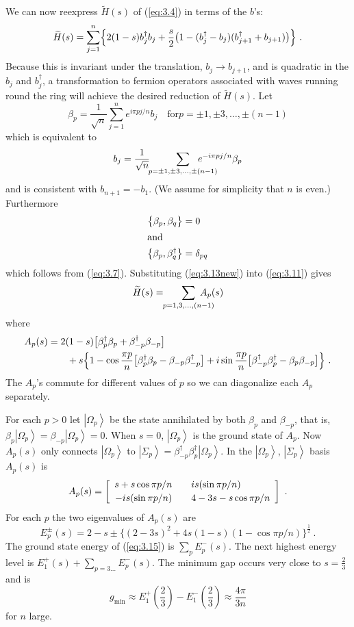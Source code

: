 \documentclass[twoside]{article}
\makeatletter
\newcommand{\ket}[1]{\left|#1\right\rangle}
\newcommand{\numEq}[2]{\begin{equation}
   \label{eq:#1}
   #2\end{equation}}
\newcommand{\refEq}[1]{(\ref{eq:#1})}
\newcommand{\gm}{g_{\min}}
\newcommand{\fract}[2]{{\textstyle\frac#1#2}}
\let\tilde\widetilde
\newcommand{\Casesnew}[1]{
  \begin{array}{r@{\qquad}l}
  #1
  \end{array}}
\numberwithin{equation}{section}
\makeatother
\begin{document}
We can now reexpress $\tilde H(s)$ of \refEq{3.4} in terms of the $b$'s:
\numEq{3.11}{
\tilde H(s) =  \sum_{j=1}^n  \Bigl\{ 2 (1-s) b_j^\dagger b_j + \frac s2
\bigl(1- (b_j^\dagger -b_j) (b_{j+1}^\dagger + b_{j+1})\bigr)
\Bigr\}\ . } 
Because this is invariant under the translation, $b_j\to b_{j+1}$, and is
quadratic in the $b_j$ and $b_j^\dagger$, a transformation to fermion
operators associated with waves running round the ring will achieve the
desired reduction of $\tilde H(s)$.  Let
\numEq{3.12}{
\beta_p = \frac1{\sqrt n} \sum_{j=1}^n  e^{i\pi pj/n} b_j\quad \mbox{for
$p=\pm1,\pm3,\dots,\pm(n-1)$}  } which is equivalent to 
\numEq{3.13new}{ b_j = \frac1{\sqrt n}\!\!
\sum_{p=\pm1,\pm3, 
\dots,\pm (n-1)}\mkern-40mu   e^{-i\pi pj/n}
\beta_p  } and is consistent with $b_{n+1}=-b_1$. (We assume for simplicity
that $n$ is even.) Furthermore
\begin{align}
\bigl\{ \beta_p, \beta_q \bigr\} &= 0 \nonumber\\
\intertext{and}
\bigl\{ \beta_p, \beta_q^\dagger \bigr\} &= \delta_{pq}
\label{eq:3.13}
\end{align} which follows from \refEq{3.7}. Substituting \refEq{3.13new}
into \refEq{3.11} gives 
\numEq{3.15}{
\tilde H(s) =\!\!  \sum_{p=1,3,\dots,(n-1)}\mkern-30mu    A_p (s) }
where
\begin{align} A_p(s) &=2 (1-s) \bigl[
\beta_p^\dagger \beta_p + \beta_{-p}^\dagger \beta_{-p}
 \bigr]\nonumber\\
&\qquad{} + s\Bigl\{ 1-\cos\frac{\pi p}n  \bigl[
\beta_p^\dagger \beta_p - \beta_{-p} \beta^\dagger_{-p}
 \bigr]  + i \sin\frac{\pi p}n  \bigl[
\beta_{-p}^\dagger \beta_p^\dagger - \beta_p \beta_{-p}
 \bigr] \Bigr\}\ .\label{eq:3.16}
\end{align} 
The $A_p$'s commute  for different values of $p$ so we can
diagonalize each
$A_p$ separately. 

For each $p>0$ let $\ket{\Omega_p}$ be the state annihilated by both
$\beta_p$ and $\beta_{-p}$, that is, $\beta_p \ket{\Omega_p} =
\beta_{-p}\ket{\Omega_p}=0$.  When $s=0$, $\ket{\Omega_p}$ is the
ground state of $A_p$.  Now $A_p(s)$ only connects $\ket{\Omega_p}$ to
$\ket{\Sigma_p}=\beta^\dagger_{-p} \beta^\dagger_p \ket{\Omega_p}$.  In
the $\ket{\Omega_p}$, $\ket{\Sigma_p}$ basis $A_p(s)$ is
\numEq{3.17}{ A_p(s) = 
\left[ \Casesnew{s+s\cos\pi p/n  & is(\sin \pi p/n) \\[.5ex]
-is(\sin\pi p/n) & 4-3s -s\cos \pi p/n}
\right]\ . } For each $p$ the two eigenvalues of $A_p(s)$ are
\numEq{3.18}{ E^\pm_p(s) = 2-s \pm \big\{(2-3s)^2 + 4s(1-s)(1-\cos \pi
p/n)
\big\}^{\frac12}  \ . } The ground state energy of \refEq{3.15} is
$\sum\limits_p E^-_p (s)$.  The next highest energy level is $E^+_1(s) +
\sum\limits_{p=3\dots} E^-_p (s)$.  The minimum gap occurs very close to
$s=\fract23$ and is
\numEq{3.19}{
\gm \approx E^+_1(\fract23) - E^-_1(\fract23)  \approx  \frac{4\pi}{3n} }
 for $n$ large.
\end{document}
